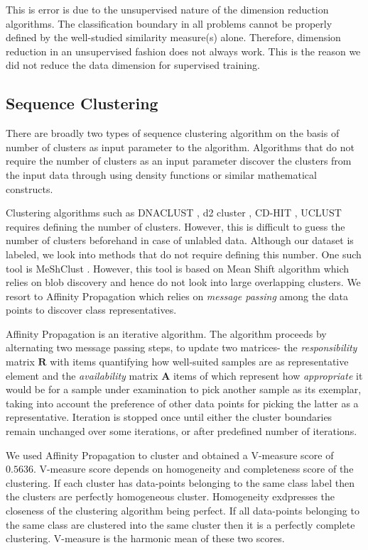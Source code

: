 \documentclass[oneside, twocolumn, a4paper, 10pt]{IEEEtran}
\begin{document}
\par
This is error is due to the unsupervised nature of the dimension reduction algorithms. The classification boundary in all problems cannot be properly defined by the well-studied similarity measure(s) alone. Therefore, dimension reduction in an unsupervised fashion does not always work. This is the reason we did not reduce the data dimension for supervised training.
\subsection{Sequence Clustering}
There are broadly two types of sequence clustering algorithm on the basis of number of clusters as input parameter to the algorithm. Algorithms that do not require the number of clusters as an input parameter discover the clusters from the input data through using density functions or similar mathematical constructs.\\
\par
Clustering algorithms such as DNACLUST \cite{11}, d2 cluster \cite{12}, CD-HIT \cite{13}, UCLUST \cite{14} requires defining the number of clusters. However, this is difficult to guess the number of clusters beforehand in case of unlabled data. Although our dataset is labeled, we look into methods that do not require defining this number. One such tool is MeShClust \cite{15}. However, this tool is based on Mean Shift algorithm which relies on blob discovery and hence do not look into large overlapping clusters. We resort to Affinity Propagation \cite{22} which relies on \textit{message passing} among the data points to discover class representatives.\\
\par 
Affinity Propagation is an iterative algorithm. The algorithm proceeds by alternating two message passing steps, to update two matrices- the \textit{responsibility} matrix $\mathbf{R}$ with items quantifying how well-suited samples are as representative element and the \textit{availability} matrix $\mathbf{A}$ items of which represent how \textit{appropriate} it would be for a sample under examination to pick another sample as its exemplar, taking into account the preference of other data points for picking the latter as a representative. Iteration is stopped once until either the cluster boundaries remain unchanged over some iterations, or after predefined number of iterations.\\
\par 
We used Affinity Propagation to cluster and obtained a V-measure score of $0.5636$. V-measure score depends on homogeneity and completeness score of the clustering. If each cluster has data-points belonging to the same class label then the clusters are perfectly homogeneous cluster. Homogeneity exdpresses the closeness of the clustering algorithm being perfect. If all data-points belonging to the same class are clustered into the same cluster then it is a perfectly complete clustering. V-measure is the harmonic mean of these two scores.
\end{document}
